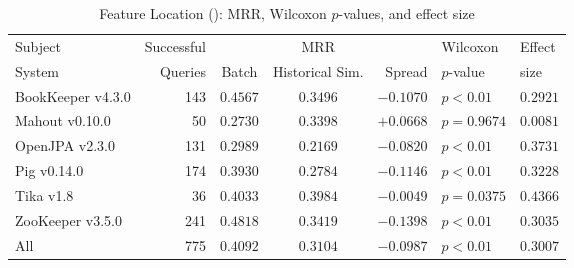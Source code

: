 \begin{table}[t]
\centering
\caption{Feature Location (\ftwo): MRR, Wilcoxon $p$-values, and effect size}
\begin{tabular}{l|r|ccr|ll}
\toprule
Subject & Successful &    & MRR &        & Wilcoxon  & Effect \\
System  & Queries    & Batch & Historical Sim.  & Spread & $p$-value & size \\
\midrule
BookKeeper v4.3.0 & 143 & $\bm{0.4567}$ & $0.3496$ & $-0.1070$ & $p < 0.01$ & $0.2921$ \\
Mahout v0.10.0 & 50 & $0.2730$ & $\bm{0.3398}$ & $+0.0668$ & $p = 0.9674$ & $0.0081$ \\
OpenJPA v2.3.0 & 131 & $\bm{0.2989}$ & $0.2169$ & $-0.0820$ & $p < 0.01$ & $0.3731$ \\
Pig v0.14.0 & 174 & $\bm{0.3930}$ & $0.2784$ & $-0.1146$ & $p < 0.01$ & $0.3228$ \\
Tika v1.8 & 36 & $\bm{0.4033}$ & $0.3984$ & $-0.0049$ & $p = 0.0375$ & $0.4366$ \\
ZooKeeper v3.5.0 & 241 & $\bm{0.4818}$ & $0.3419$ & $-0.1398$ & $p < 0.01$ & $0.3035$ \\
\midrule
All & 775 & $\bm{0.4092}$ & $0.3104$ & $-0.0987$ & $p < 0.01$ & $0.3007$ \\
\bottomrule
\end{tabular}
\label{table:feature_location_rq2}
\end{table}
